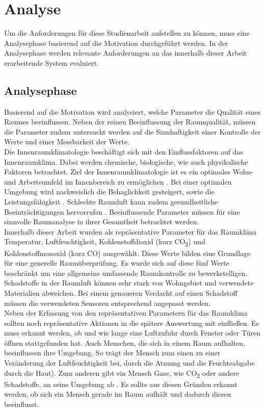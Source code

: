\chapter{Analyse}
Um die Anforderungen für diese Studienarbeit aufstellen zu können, muss eine Analysephase basierend auf die Motivation durchgeführt werden. In der Analysephase werden relevante Anforderungen an das innerhalb dieser Arbeit erarbeitende System evaluiert.
\section{Analysephase}
Basierend auf die Motivation wird analysiert, welche Parameter die Qualität eines Raumes beeinflussen. Neben der reinen Beeinflussung der Raumqualität, müssen die Parameter zudem untersucht werden auf die Sinnhaftigkeit einer Kontrolle der Werte und einer Messbarkeit der Werte.\\
Die Innenraumklimatologie beschäftigt sich mit den Einflussfaktoren auf das Innenraumklima. Dabei werden chemische, biologische, wie auch physikalische Faktoren betrachtet. Ziel der Innenraumklimatologie ist es ein optimales Wohn- und Arbeitsumfeld im Innenbereich zu ermöglichen \cite{raumluft:Innenraumklimatologie}. Bei einer optimalen Umgebung wird nachweislich die Behaglichkeit gesteigert, sowie die Leistungsfähigkeit \cite{Raumklimatechnik}. Schlechte Raumluft kann zudem gesundheitliche Beeinträchtigungen hervorrufen \cite{raumluft:InnenluftqualitaetundGesundheit}. Beeinflussende Parameter müssen für eine sinnvolle Raumanalyse in ihrer Gesamtheit betrachtet werden.\\
Innerhalb dieser Arbeit wurden als repräsentative Parameter für das Raumklima Temperatur, Luftfeuchtigkeit, Kohlenstoffdioxid (kurz CO\textsubscript{2}) und Kohlenstoffmonoxid (kurz CO) ausgewählt. Diese Werte bilden eine Grundlage für eine generelle Raumüberprüfung. Es wurde sich auf diese fünf Werte beschränkt um eine allgemeine umfassende Raumkontrolle zu bewerkstelligen. Schadstoffe in der Raumluft können sehr stark von Wohngebiet und verwendete Materialien abweichen. Bei einem genaueren Verdacht auf einen Schadstoff müssen die verwendeten Sensoren entsprechend angepasst werden.\\
Neben der Erfassung von den repräsentativen Parametern für das Raumklima sollten noch repräsentative Aktionen in die spätere Auswertung mit einfließen. Es muss erkannt werden, ob und wie lange eine Luftzufuhr durch Fenster oder Türen öffnen stattgefunden hat. Auch Menschen, die sich in einem Raum aufhalten, beeinflussen ihre Umgebung. So trägt der Mensch zum einen zu einer Veränderung der Luftfeuchtigkeit bei, durch die Atmung und die Feuchteabgabe durch die Haut). Zum anderen gibt ein Mensch Gase, wie CO\textsubscript{2} oder andere Schadstoffe, an seine Umgebung ab \cite{raumluft:Luftmengen}. Es sollte aus diesen Gründen erkannt werden, ob sich ein Mensch gerade im Raum aufhält und dadurch diesen beeinflusst.\\
